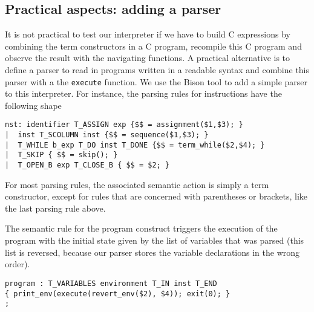 \documentclass{book}
\begin{document}
\subsection{Practical aspects: adding a parser}
It is not practical to test our interpreter if we have to build C
expressions by combining the term constructors in a C program, recompile
this C program and observe the result with the navigating functions.
A practical alternative is to define a parser to read in programs written
in a readable syntax and combine this parser with a the {\tt execute} 
function.  We use the Bison tool to add a simple parser to this interpreter.
For instance, the parsing rules for instructions have the following
shape
\begin{verbatim}
nst: identifier T_ASSIGN exp {$$ = assignment($1,$3); }
|  inst T_SCOLUMN inst {$$ = sequence($1,$3); }
|  T_WHILE b_exp T_DO inst T_DONE {$$ = term_while($2,$4); }
|  T_SKIP { $$ = skip(); }
|  T_OPEN_B exp T_CLOSE_B { $$ = $2; }
\end{verbatim}
For most parsing rules, the associated semantic action is simply a
term constructor, except for rules that are concerned with parentheses or
brackets, like the last parsing rule above.

The semantic rule for the program construct triggers
the execution of the program with the initial state given by the
list of variables that was parsed (this list is reversed, because
our parser stores the variable declarations in the wrong order).
\begin{verbatim}
program : T_VARIABLES environment T_IN inst T_END
{ print_env(execute(revert_env($2), $4)); exit(0); }
;
\end{verbatim}
\end{document}
